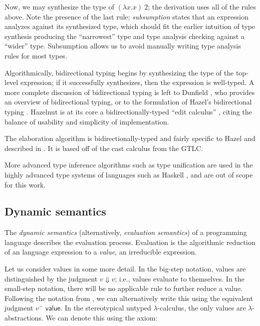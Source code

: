 Now, we may synthesize the type of $(\lambda x.x)\ 2$; the derivation uses all of the rules above. Note the presence of the last rule; \textit{subsumption} states that an expression analyzes against its synthesized type, which should fit the earlier intuition of type synthesis producing the ``narrowest'' type and type analysis checking against a ``wider'' type. Subsumption allows us to avoid manually writing type analysis rules for most types.

Algorithmically, bidirectional typing begins by synthesizing the type of the top-level expression; if it successfully synthesizes, then the expression is well-typed. A more complete discussion of bidirectional typing is left to Dunfield \cite{Dunfield_2022}, who provides an overview of bidirectional typing, or to the formulation of Hazel's bidirectional typing \cite{conf/popl/Hazelnut17}. Hazelnut is at its core a bidirectionally-typed ``edit calculus'' \cite{conf/popl/Hazelnut17}, citing the balance of usability and simplicity of implementation.

The elaboration algorithm is bidirectionally-typed and fairly specific to Hazel and described in . It is based off of the cast calculus from the GTLC.

More advanced type inference algorithms such as type unification are used in the highly advanced type systems of languages such as Haskell \cite{gundry2013type}, and are out of scope for this work.

\subsection{Dynamic semantics}
\label{sec:dynamic-semantics}

The \textit{dynamic semantics} (alternatively, \textit{evaluation semantics}) of a programming language describes the evaluation process. Evaluation is the algorithmic reduction of an language expression to a \textit{value}, an irreducible expression.

Let us consider values in some more detail. In the big-step notation, values are distinguished by the judgment $v\Downarrow v$; i.e., values evaluate to themselves. In the small-step notation, there will be no applicable rule to further reduce a value. Following the notation from \cite{conf/popl/Hazelnut17,conf/popl/HazelnutLive19}, we can alternatively write this using the equivalent judgment $v^-\textsf{ value}$. In the stereotypical untyped $\lambda$-calculus, the only values are $\lambda$-abstractions. We can denote this using the axiom:


